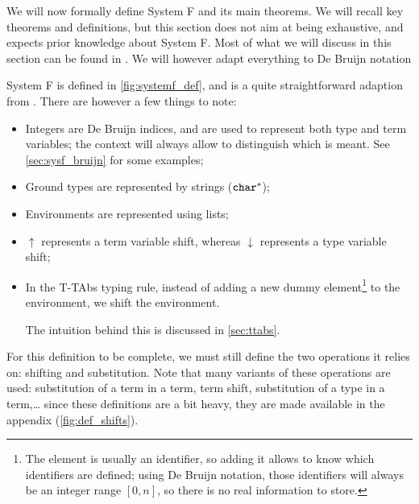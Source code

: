 We will now formally define System F and its main theorems.
We will recall key theorems and definitions, but this section does not aim at being exhaustive, and expects prior knowledge about System F.
Most of what we will discuss in this section can be found in \cite[Chapter~23]{tapl}.
We will however adapt everything to De Bruijn notation \cite[Chapter~6]{tapl}
\begin{figure*}
    \begin{subfigure}{\textwidth}
    \raggedright
    
    \end{subfigure}
    \caption{Definition of System F}
    \label{fig:systemf_def}
\end{figure*}

System F is defined in \cref{fig:systemf_def}, and is a quite straightforward adaption from \cite[Figure 23-1]{tapl}. 
There are however a few things to note:
\begin{itemize}
    \item Integers are De Bruijn indices, and are used to represent both type and term variables; the context will always allow to distinguish which is meant. See \cref{sec:sysf_bruijn} for some examples;
    \item Ground types are represented by strings ($\texttt{char}^{*}$);
    \item Environments are represented using lists;
    \item $\uparrow$ represents a term variable shift, whereas $\downarrow$ represents a type variable shift;
    \item In the T-TAbs typing rule, instead of adding a new dummy element\footnote{The element is usually an identifier, so adding it allows to know which identifiers are defined; using De Bruijn notation, those identifiers will always be an integer range $[0,n]$, so there is no real information to store.} to the environment, we shift the environment.
    
    The intuition behind this is discussed in \cref{sec:ttabs}.
\end{itemize}

For this definition to be complete, 
we must still define the two operations it relies on: shifting and substitution.
Note that many variants of these operations are used:
substitution of a term in a term, term shift, substitution of a type in a term,\ldots{}
since these definitions are a bit heavy, they are made available in the appendix (\cref{fig:def_shifts}).

